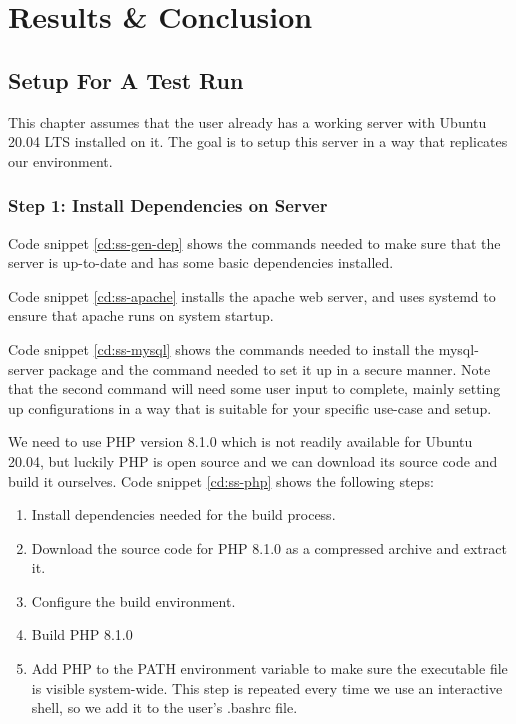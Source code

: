 \part{Results \& Conclusion}
\chapter{Setup For A Test Run}
\label{ch:res-conc}
This chapter assumes that the user already has a working server with Ubuntu 20.04 LTS installed on it. The goal is to setup this server in a way that replicates our environment.
\section{Step 1: Install Dependencies on Server}
Code snippet \ref{cd:ss-gen-dep} shows the commands needed to make sure that the server is up-to-date and has some basic dependencies installed.


Code snippet \ref{cd:ss-apache} installs the apache web server, and uses systemd to ensure that apache runs on system startup.


Code snippet \ref{cd:ss-mysql} shows the commands needed to install the mysql-server package and the command needed to set it up in a secure manner. Note that the second command will need some user input to complete, mainly setting up configurations in a way that is suitable for your specific use-case and setup.


We need to use PHP version 8.1.0 which is not readily available for Ubuntu 20.04, but luckily PHP is open source and we can download its source code and build it ourselves. Code snippet \ref{cd:ss-php} shows the following steps:
\begin{enumerate}
	\item Install dependencies needed for the build process.
	\item Download the source code for PHP 8.1.0 as a compressed archive and extract it.
	\item Configure the build environment.
	\item Build PHP 8.1.0
	\item Add PHP to the PATH environment variable to make sure the executable file is visible system-wide. This step is repeated every time we use an interactive shell, so we add it to the user's .bashrc file.
\end{enumerate}


